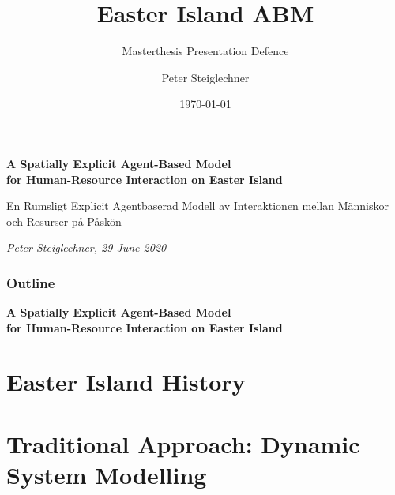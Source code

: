 \documentclass[aspectratio=1610]{beamer}
\author{Peter Steiglechner}
\title{Easter Island ABM}
\subtitle{Masterthesis Presentation Defence}
\institute{ZMT Bremen}
\date{\today}
\begin{document}
	
	\startpage
	\begin{frame}[noframenumbering]
	
	\vspace{0.02\textheight}
	\begin{Large}\begin{center}
		\textbf{A Spatially Explicit Agent-Based Model \\ for Human-Resource Interaction on Easter Island}
\end{center}\end{Large}
	\vspace{0.01\textheight}

	\begin{small}
		\begin{center}
		En Rumsligt Explicit Agentbaserad Modell av Interaktionen mellan Människor och Resurser på Påskön
		\end{center}

	\end{small}
	
	\vspace{0.02\textheight}
	
	\begin{small}
		\begin{center}
		\textit{Peter Steiglechner, 29 June 2020}
		\end{center}

	\end{small}
\end{frame}


\normalpage


\begin{frame}[noframenumbering]
\frametitle{Outline}
	\begin{Large}\begin{center}
	\textbf{A Spatially Explicit Agent-Based Model \\ for Human-Resource Interaction on Easter Island}
	\end{center}\end{Large}
\tableofcontents
\end{frame}



\section{Easter Island History}


\section{Traditional Approach: Dynamic System Modelling}

\end{document}
